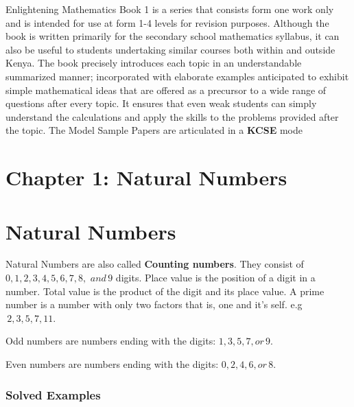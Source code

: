 \documentclass[
  letterpaper,
  DIV=11,
  numbers=noendperiod]{scrreprt}
\begin{document}
Enlightening Mathematics Book 1 is a series that consists form one work
only and is intended for use at form 1-4 levels for revision purposes.
Although the book is written primarily for the secondary school
mathematics syllabus, it can also be useful to students undertaking
similar courses both within and outside Kenya. The book precisely
introduces each topic in an understandable summarized manner;
incorporated with elaborate examples anticipated to exhibit simple
mathematical ideas that are offered as a precursor to a wide range of
questions after every topic. It ensures that even weak students can
simply understand the calculations and apply the skills to the problems
provided after the topic. The Model Sample Papers are articulated in a
\textbf{KCSE} mode


\hypertarget{chapter-1-natural-numbers}{%
\chapter{Chapter 1: Natural Numbers}\label{chapter-1-natural-numbers}}


\hypertarget{natural-numbers}{%
\chapter*{Natural Numbers}\label{natural-numbers}}


Natural Numbers are also called \textbf{Counting numbers}. They consist
of \(0, 1, 2, 3, 4, 5, 6, 7, 8,\) \(and\, 9\) digits. Place value is the
position of a digit in a number. Total value is the product of the digit
and its place value. A prime number is a number with only two factors
that is, one and it's self. e.g \(\,2, 3, 5, 7, 11.\)

Odd numbers are numbers ending with the digits: \(1, 3, 5, 7, or \,9.\)

Even numbers are numbers ending with the digits: \(0, 2, 4, 6, or\, 8.\)

\hypertarget{solved-examples}{%
\subsection{Solved Examples}\label{solved-examples}}
\end{document}
